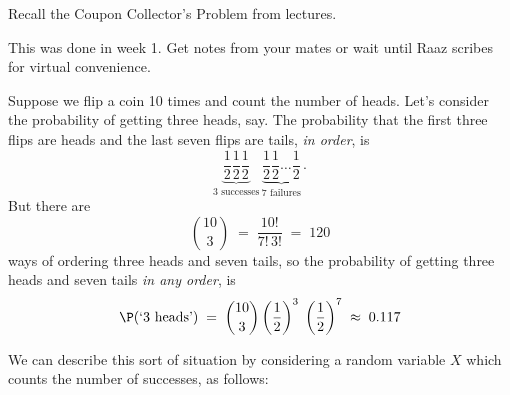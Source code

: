 \begin{Exercise}[title={Coupon Collector's Probem},label={xCouponCollPr}]
Recall the Coupon Collector's Problem from lectures.%
\end{Exercise}
\begin{Answer}
This was done in week 1. Get notes from your mates or wait until Raaz scribes for virtual convenience.
\end{Answer}

\begin{example}\label{Exmp:Flip10times}
Suppose we flip a coin 10 times and count the number of heads.  Let's consider the probability of getting three  heads, say. 
The probability that the first three flips are heads and the last  seven  flips are tails, \emph{in order},  is \[ \underbrace{\frac{1}{2} \frac{1}{2}
    \frac{1}{2}}_{3 \text{ successes}}
  \,\underbrace{\frac{1}{2} \frac{1}{2} \dots \frac{1}{2}}_{7
    \text{ failures}} \, .\]
But there are \[\binom{10}{3} \;=\; \frac{10!}{7!\, 3!}\;=\;120 \] ways
of ordering three heads and seven tails,  so the
  probability  of getting three  heads and seven  tails \emph{in any order},  is\[\P( \text{`} 3 \text{ heads'}) \;=\; \binom{10}{3}  \left(\frac{1}{2}\right)^3
  \;\left(\frac{1}{2}\right)^7 \;\approx\; 0.117\]
\end{example}

We can describe  this sort of situation by considering a random variable $X$ which counts the number of successes, as follows:

\remove{
The RV $Y$ in \hyperref[T:T3XRVs]{Table \ref*{T:T3XRVs}} may be generalized to an experiment $\EE{E}_{\theta}^{n}$ with $n$ coin tosses.  
Let $X_i$ be the Indicator function of the event `Heads on the $i$-th toss' as before.  Then $Y$ defined by,
 \[
 Y := \sum_{i=1}^n X_i := X_1 + X_2 + \cdots + X_n  \ ,
 \]
is the number of `Heads' in $n$ tosses.  
Akin to the second row of \hyperref[T:T3XRVs]{Table \ref*{T:T3XRVs}}, for the `Toss $n$ times' experiment $\EE{E}_{\theta}^{n}$ the
RV $Y$ as defined above will take values in $\{0,1,2,\ldots,n\}$ and is therefore a discrete RV.  This is called the Binomial RV as defined next.  
But, first we remind ourselves of some elementary definitions involving arrangements of objects from a collection (recall \hyperref[S:PermsFactsCombs]{Section~\ref*{S:PermsFactsCombs}}).
}

